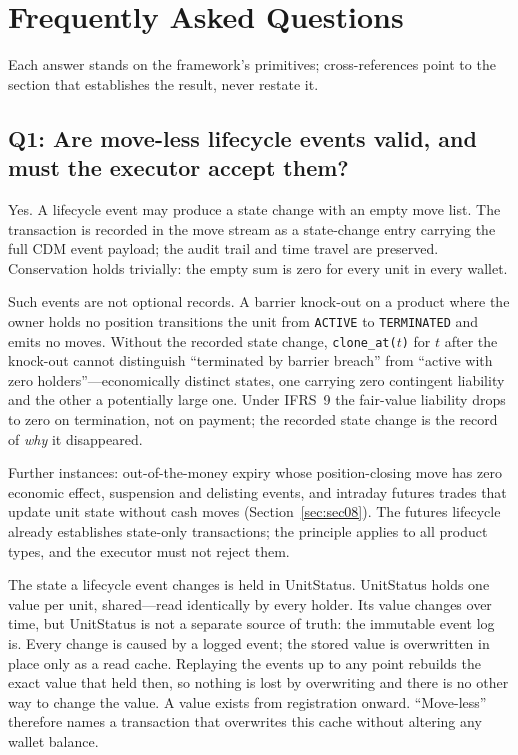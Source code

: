 \section{Frequently Asked Questions}
\label{sec:sec20}

Each answer stands on the framework's primitives; cross-references point to the section that establishes the result, never restate it.

\subsection*{Q1: Are move-less lifecycle events valid, and must the executor accept them?}

Yes. A lifecycle event may produce a state change with an empty move list. The transaction is recorded in the move stream as a state-change entry carrying the full CDM event payload; the audit trail and time travel are preserved. Conservation holds trivially: the empty sum is zero for every unit in every wallet.

Such events are not optional records. A barrier knock-out on a product where the owner holds no position transitions the unit from \texttt{ACTIVE} to \texttt{TERMINATED} and emits no moves. Without the recorded state change, \texttt{clone\_at($t$)} for $t$ after the knock-out cannot distinguish ``terminated by barrier breach'' from ``active with zero holders''---economically distinct states, one carrying zero contingent liability and the other a potentially large one. Under IFRS~9 the fair-value liability drops to zero on termination, not on payment; the recorded state change is the record of \emph{why} it disappeared.

Further instances: out-of-the-money expiry whose position-closing move has zero economic effect, suspension and delisting events, and intraday futures trades that update unit state without cash moves (Section~\ref{sec:sec08}). The futures lifecycle already establishes state-only transactions; the principle applies to all product types, and the executor must not reject them.

\begin{remark}
The state a lifecycle event changes is held in UnitStatus. UnitStatus holds one value per unit, shared---read identically by every holder. Its value changes over time, but UnitStatus is not a separate source of truth: the immutable event log is. Every change is caused by a logged event; the stored value is overwritten in place only as a read cache. Replaying the events up to any point rebuilds the exact value that held then, so nothing is lost by overwriting and there is no other way to change the value. A value exists from registration onward. ``Move-less'' therefore names a transaction that overwrites this cache without altering any wallet balance.
\end{remark}

